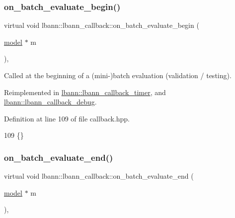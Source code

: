 \subsubsection{\texorpdfstring{on\+\_\+batch\+\_\+evaluate\+\_\+begin()}{on\_batch\_evaluate\_begin()}}
{\footnotesize\ttfamily virtual void lbann\+::lbann\+\_\+callback\+::on\+\_\+batch\+\_\+evaluate\+\_\+begin (\begin{DoxyParamCaption}\item[{\hyperlink{classlbann_1_1model}{model} $\ast$}]{m }\end{DoxyParamCaption})\hspace{0.3cm}{\ttfamily [inline]}, {\ttfamily [virtual]}}

Called at the beginning of a (mini-\/)batch evaluation (validation / testing). 

Reimplemented in \hyperlink{classlbann_1_1lbann__callback__timer_abef3c43404a7453a383fe47728d3283b}{lbann\+::lbann\+\_\+callback\+\_\+timer}, and \hyperlink{classlbann_1_1lbann__callback__debug_ac364fb6e77dc163e146af77bb670d74b}{lbann\+::lbann\+\_\+callback\+\_\+debug}.



Definition at line 109 of file callback.\+hpp.


\begin{DoxyCode}
109 \{\}
\end{DoxyCode}
\mbox{\label{classlbann_1_1lbann__callback_ad10891b8ab3de74ee1a70e6255e7d58a}} 
\subsubsection{\texorpdfstring{on\+\_\+batch\+\_\+evaluate\+\_\+end()}{on\_batch\_evaluate\_end()}}
{\footnotesize\ttfamily virtual void lbann\+::lbann\+\_\+callback\+::on\+\_\+batch\+\_\+evaluate\+\_\+end (\begin{DoxyParamCaption}\item[{\hyperlink{classlbann_1_1model}{model} $\ast$}]{m }\end{DoxyParamCaption})\hspace{0.3cm}{\ttfamily [inline]}, {\ttfamily [virtual]}}

